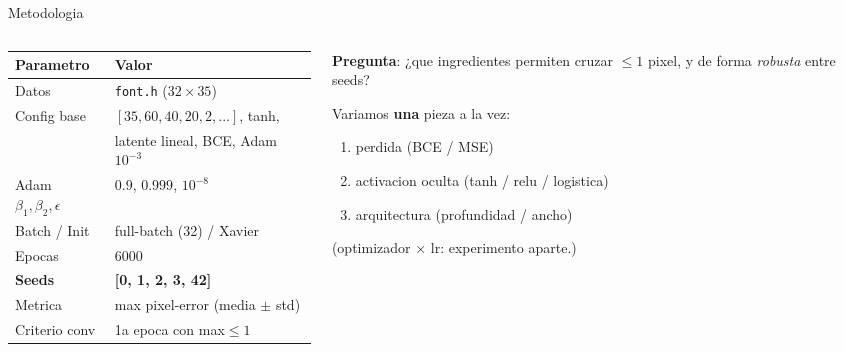 \documentclass[aspectratio=169, 10pt]{beamer}
\begin{document}

\begin{frame}{Metodologia}
  \begin{columns}[T]
    \begin{column}{0.55\textwidth}
      \begin{table}\small
        \begin{tabular}{ll}
          \toprule
          Parametro & Valor \\
          \midrule
          Datos        & \texttt{font.h} ($32\times35$) \\
          Config base  & $[35,60,40,20,2,...]$, tanh, \\
                       & latente lineal, BCE, Adam $10^{-3}$ \\
          Adam $\beta_1,\beta_2,\epsilon$ & $0.9$, $0.999$, $10^{-8}$ \\
          Batch / Init & full-batch (32) / Xavier \\
          Epocas       & 6000 \\
          \textbf{Seeds}& \textbf{[0, 1, 2, 3, 42]} \\
          \midrule
          Metrica      & max pixel-error (media $\pm$ std) \\
          Criterio conv& 1a epoca con max$\le 1$ \\
          \bottomrule
        \end{tabular}
      \end{table}
    \end{column}
    \begin{column}{0.43\textwidth}
      \textbf{Pregunta}: ¿que ingredientes permiten cruzar $\le 1$ pixel, y de forma
      \emph{robusta} entre seeds?

      \vspace{0.6em}
      Variamos \textbf{una} pieza a la vez:
      \begin{enumerate}
        \item perdida (BCE / MSE)
        \item activacion oculta (tanh / relu / logistica)
        \item arquitectura (profundidad / ancho)
      \end{enumerate}
      \vspace{0.3em}
      {\footnotesize (optimizador $\times$ lr: experimento aparte.)}
    \end{column}
  \end{columns}
\end{frame}
\end{document}
